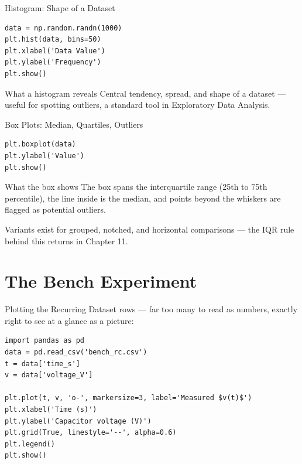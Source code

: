 \documentclass[9pt,aspectratio=169,xcolor=table]{beamer}
\begin{document}
\begin{frame}[fragile]{Histogram: Shape of a Dataset}
    \leavevmode
\begin{lstlisting}
data = np.random.randn(1000)
plt.hist(data, bins=50)
plt.xlabel('Data Value')
plt.ylabel('Frequency')
plt.show()
\end{lstlisting}

    \vspace{2mm}
    \begin{block}{What a histogram reveals}
        Central tendency, spread, and shape of a dataset --- useful for
        spotting outliers, a standard tool in Exploratory Data Analysis.
    \end{block}
\end{frame}

\begin{frame}[fragile]{Box Plots: Median, Quartiles, Outliers}
    \leavevmode
\begin{lstlisting}
plt.boxplot(data)
plt.ylabel('Value')
plt.show()
\end{lstlisting}

    \vspace{2mm}
    \begin{block}{What the box shows}
        The box spans the interquartile range (25th to 75th percentile),
        the line inside is the \alert{median}, and points beyond the
        whiskers are flagged as potential \alert{outliers}.
    \end{block}

    \vspace{1mm}
    {\small Variants exist for grouped, notched, and horizontal
    comparisons --- the IQR rule behind this returns in Chapter 11.}
\end{frame}

\section{The Bench Experiment}

\begin{frame}[fragile]{Plotting the Recurring Dataset}
     rows --- far too many to read as numbers, exactly right to see
    at a glance as a picture:

\begin{lstlisting}
import pandas as pd
data = pd.read_csv('bench_rc.csv')
t = data['time_s']
v = data['voltage_V']

plt.plot(t, v, 'o-', markersize=3, label='Measured $v(t)$')
plt.xlabel('Time (s)')
plt.ylabel('Capacitor voltage (V)')
plt.grid(True, linestyle='--', alpha=0.6)
plt.legend()
plt.show()
\end{lstlisting}
\end{frame}
\end{document}
